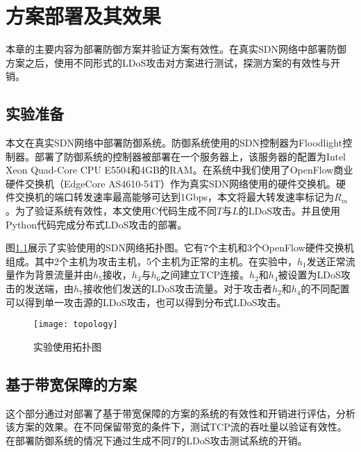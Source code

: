 \chapter{方案部署及其效果}
\label{cha:experiment}
本章的主要内容为部署防御方案并验证方案有效性。在真实SDN网络中部署防御方案之后，使用不同形式的LDoS攻击对方案进行测试，探测方案的有效性与开销。

\section{实验准备}
\label{chap5:setup}
本文在真实SDN网络中部署防御系统。防御系统使用的SDN控制器为Floodlight控制器。部署了防御系统的控制器被部署在一个服务器上，该服务器的配置为Intel Xeon Quad-Core CPU E5504和4GB的RAM。在系统中我们使用了OpenFlow商业硬件交换机（EdgeCore AS4610-54T）作为真实SDN网络使用的硬件交换机。硬件交换机的端口转发速率最高能够可达到1Gbps，本文将最大转发速率标记为$R_m$。为了验证系统有效性，本文使用C代码生成不同$T$与$L$的LDoS攻击。并且使用Python代码完成分布式LDoS攻击的部署。

图\ref{fig:topology}展示了实验使用的SDN网络拓扑图。它有7个主机和3个OpenFlow硬件交换机组成。其中2个主机为攻击主机，5个主机为正常的主机。在实验中，$h_1$发送正常流量作为背景流量并由$h_5$接收，$h_3$与$h_6$之间建立TCP连接。$h_2$和$h_4$被设置为LDoS攻击的发送端，由$h_7$接收他们发送的LDoS攻击流量。对于攻击者$h_2$和$h_4$的不同配置可以得到单一攻击源的LDoS攻击，也可以得到分布式LDoS攻击。


\begin{figure}
    \centering
    \texttt{[image: topology]}
    \caption{实验使用拓扑图}
    \label{fig:topology}
\end{figure}


\section{基于带宽保障的方案}
\label{chap5:bandwidth-reserve-solution}

这个部分通过对部署了基于带宽保障的方案的系统的有效性和开销进行评估，分析该方案的效果。在不同保留带宽的条件下，测试TCP流的吞吐量以验证有效性。在部署防御系统的情况下通过生成不同$T$的LDoS攻击测试系统的开销。


